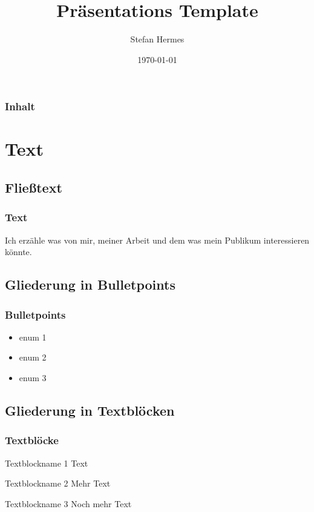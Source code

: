 \documentclass{beamer}
\title[Präsentations Template]{Präsentations Template}
\author{Stefan Hermes}
\institute[ME]{Home made}
\date{\today}
\begin{document}
\begin{frame}
\titlepage
\end{frame}

\begin{frame}
\frametitle{Inhalt}
\tableofcontents
\end{frame}

\section{Text}
\subsection{Fließtext}

\begin{frame}
\frametitle{Text}
Ich erzähle was von mir, meiner Arbeit und dem was mein Publikum interessieren könnte.
\end{frame}

\subsection{Gliederung in Bulletpoints}

\begin{frame}
\frametitle{Bulletpoints}
\begin{itemize}
\item enum 1 \pause
\item enum 2
\item enum 3
\end{itemize}
\end{frame}

\subsection{Gliederung in Textblöcken}

\begin{frame}
\frametitle{Textblöcke}

\begin{block}{Textblockname 1}
Text
\end{block}

\pause

\begin{block}{Textblockname 2}
Mehr Text
\end{block}

\begin{block}{Textblockname 3}
Noch mehr Text
\end{block}

\end{frame}
\end{document}

